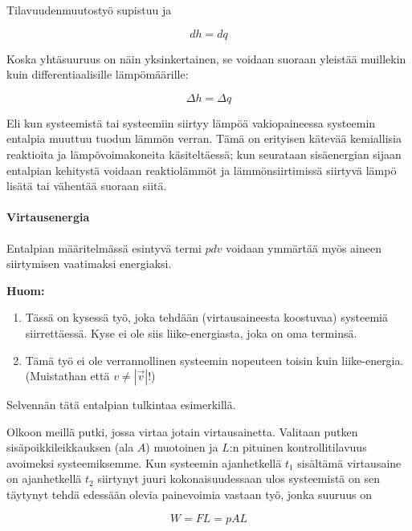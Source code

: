 \documentclass[12pt,a4paper,finnish]{book}
\begin{document}
Tilavuudenmuutostyö supistuu ja

\begin{equation}
 dh = dq
\end{equation}

Koska yhtäsuuruus on näin yksinkertainen, se voidaan suoraan yleistää muillekin kuin differentiaalisille lämpömäärille:

\begin{equation}
 \Delta h = \Delta q
\end{equation}

Eli kun systeemistä tai systeemiin siirtyy lämpöä vakiopaineessa systeemin entalpia muuttuu tuodun lämmön verran. Tämä 
on erityisen kätevää kemiallisia reaktioita ja lämpövoimakoneita käsiteltäessä; kun seurataan sisäenergian sijaan 
entalpian kehitystä voidaan reaktiolämmöt ja lämmönsiirtimissä siirtyvä lämpö lisätä tai vähentää suoraan siitä.

\paragraph{Virtausenergia}

Entalpian määritelmässä esintyvä termi $pdv$ voidaan ymmärtää myös aineen siirtymisen vaatimaksi energiaksi. 

\textbf{Huom:}

\begin{enumerate}
 \item Tässä on kysessä työ, joka tehdään (virtausaineesta koostuvaa) systeemiä siirrettäessä. Kyse ei ole siis liike-energiasta, 
  joka on oma terminsä.
 \item Tämä työ ei ole verrannollinen systeemin nopeuteen toisin kuin liike-energia. (Muistathan että $v \neq \left|\vec{v}\right|$!)
\end{enumerate}

Selvennän tätä entalpian tulkintaa esimerkillä.

Olkoon meillä putki, jossa virtaa jotain virtausainetta. Valitaan putken sisäpoikkileikkauksen (ala $A$) muotoinen ja $L$:n 
pituinen kontrollitilavuus avoimeksi systeemiksemme. Kun systeemin ajanhetkellä $t_1$ sisältämä virtausaine on 
ajanhetkellä $t_2$ siirtynyt juuri kokonaisuudessaan ulos systeemistä on sen täytynyt tehdä edessään olevia 
painevoimia vastaan työ, jonka suuruus on

\begin{equation}
 W = FL = pAL
\end{equation}
\end{document}
